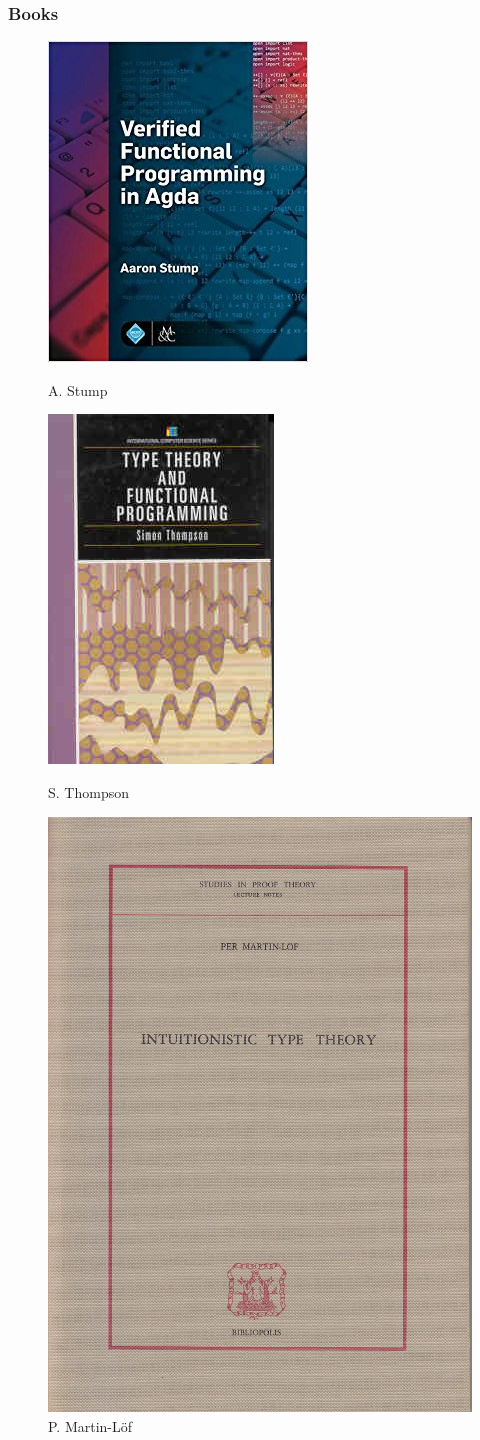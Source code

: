 \documentclass[xetex]{beamer}
\begin{document}
\begin{frame}
  \frametitle{Books}
  \begin{figure}[ht] 
  \label{ fig7} 
  \begin{minipage}[b]{0.5\linewidth}
    \centering
    \includegraphics[width=.3\linewidth]{agdabook} 
    \caption*{A. Stump} 
    \vspace{4ex}
  \end{minipage}%
  \begin{minipage}[b]{0.5\linewidth}
    \centering
    \includegraphics[width=.3\linewidth]{ttfpbook} 
    \caption*{S. Thompson} 
    \vspace{4ex}
  \end{minipage} 
  \begin{minipage}[b]{0.5\linewidth}
    \centering
    \includegraphics[width=.3\linewidth]{mlttbook} 
    \caption*{P. Martin-L\"of} 
    \vspace{4ex}

\end{minipage}
\end{figure}
\end{frame}
\end{document}
